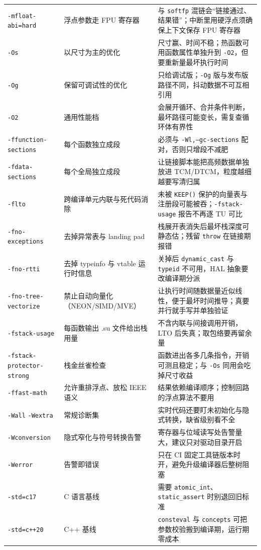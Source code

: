\documentclass[12pt,a4paper,fontset=fandol]{ctexbook}
\newcommand{\Tp}[1]{\texttt{#1}}
\newcommand{\Bk}{\discretionary{}{}{}}
\begin{document}
\begin{longtable}{>{\raggedright\arraybackslash\footnotesize}p{} >{\raggedright\arraybackslash\footnotesize}p{} >{\raggedright\arraybackslash\footnotesize}p{}}
\Tp{-mfloat-abi=hard} & 浮点参数走 FPU 寄存器 & 与 \Tp{softfp} 混链会``链接通过、结果错''；中断里用硬浮点须确保上下文保存 FPU 寄存器 \\
\Tp{-Os} & 以尺寸为主的优化 & 尺寸赢、时间不稳；热函数可用函数属性单独升到 \Tp{-O2}，但要重新量最坏执行时间 \\
\Tp{-Og} & 保留可调试性的优化 & 只给调试版；\Tp{-Og} 版与发布版路径不同，抖动数据不可互相引用 \\
\Tp{-O2} & 通用性能档 & 会展开循环、合并条件判断，最坏路径可能变长，需复查循环体有界性 \\
\Tp{-ffunction-sections} & 每个函数独立成段 & 必须与 \Tp{-Wl,--gc-sections} 配对，否则只增段不减肥 \\
\Tp{-fdata-sections} & 每个全局独立成段 & 让链接脚本能把高频数据单独放进 TCM/DTCM，粒度越细越要写清归属 \\
\Tp{-flto} & 跨编译单元内联与死代码消除 & 未被 \Tp{KEEP()} 保护的向量表与注册段可能被吞；\Tp{-fstack-usage} 报告不再逐 TU 可比 \\
\Tp{-fno-exceptions} & 去掉异常表与 landing pad & 栈展开表消失后最坏栈深度可静态估；残留 \Tp{throw} 在链接期报错 \\
\Tp{-fno-rtti} & 去掉 typeinfo 与 vtable 运行时信息 & 关掉后 \Tp{dynamic\_cast} 与 \Tp{typeid} 不可用，HAL 抽象要改编译期分派 \\
\Tp{-fno-tree-vectorize} & 禁止自动向量化（NEON/SIMD/MVE） & 让执行时间随数据量近似线性，便于最坏时间推导；真要并行就手写并单独验证 \\
\Tp{-fstack-usage} & 每函数输出 .su 文件给出栈用量 & 不含内联与间接调用开销，LTO 后失真；取包络要再留余量 \\
\Tp{-{\Bk}fstack-{\Bk}protector-{\Bk}strong} & 栈金丝雀检查 & 函数进出各多几条指令，开销可测且稳定；与 \Tp{-{\Bk}Os} 同用会吃掉尺寸收益 \\
\Tp{-ffast-math} & 允许重排浮点、放松 IEEE 语义 & 结果依赖编译顺序；控制回路的浮点算法不要用 \\
\Tp{-Wall} \Tp{-Wextra} & 常规诊断集 & 实时代码还要盯未初始化与隐式转换，缺省级别看不全 \\
\Tp{-Wconversion} & 隐式窄化与符号转换告警 & 寄存器与位域读写处告警量大，建议只对驱动目录开启 \\
\Tp{-Werror} & 告警即错误 & 只在 CI 固定工具链版本时开，避免升级编译器后整树阻塞 \\
\Tp{-std=c17} & C 语言基线 & 需要 \Tp{atomic\_int}、\Tp{static\_assert} 时别退回旧标准 \\
\Tp{-std=c++20} & C++ 基线 & \Tp{consteval} 与 \Tp{concepts} 可把参数校验搬到编译期，运行期零成本 \\

\end{longtable}
\end{document}
